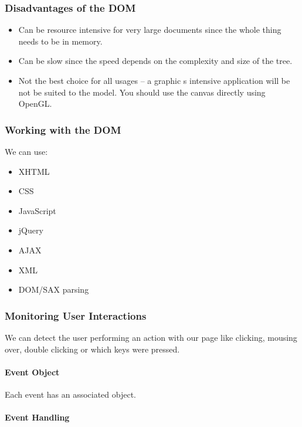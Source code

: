 \subsubsection{Disadvantages of the DOM}\label{ssub:disadvantages_of_the_dom}

\begin{itemize}
	\item Can be resource intensive for very large documents since the whole thing needs to be in memory.
	\item Can be slow since the speed depends on the complexity and size of the tree.
	\item Not the best choice for all usages -- a graphic s intensive application will be not be suited to the model.
	      You should use the canvas directly using OpenGL.
\end{itemize}

\subsubsection{Working with the DOM}\label{ssub:working_with_the_dom}

We can use:
\begin{itemize}
	\item XHTML
	\item CSS
	\item JavaScript
	\item jQuery
	\item AJAX
	\item XML
	\item DOM/SAX parsing
\end{itemize}

\subsubsection{Monitoring User Interactions}\label{ssub:monitoring_user_interactions}

We can detect the user performing an action with our page like clicking, mousing over, double clicking or which keys were pressed.

\paragraph{Event Object}\label{par:event_object}

Each event has an associated object.

\paragraph{Event Handling}\label{par:event_handling}

